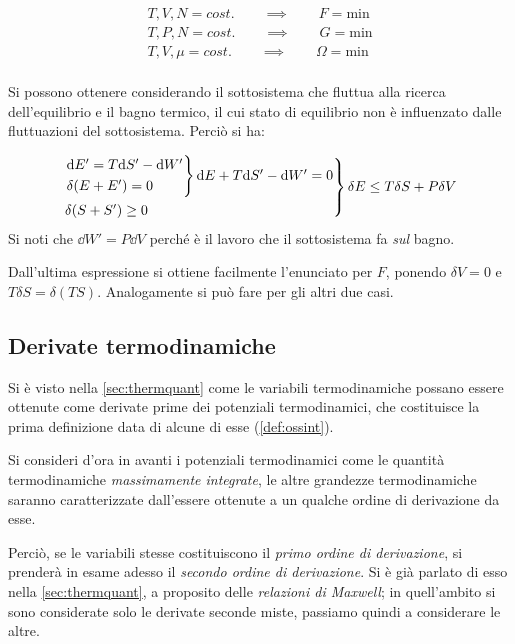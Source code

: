 \begin{align*}
	T, V, N = cost. \qquad \implies \qquad F = \text{min}\\
	T, P, N = cost. \qquad \implies \qquad G = \text{min}\\
	T, V, \mu = cost. \qquad \implies \qquad \Omega = \text{min}\\
\end{align*}

Si possono ottenere considerando il sottosistema che fluttua alla ricerca dell'equilibrio e il bagno termico, il cui stato di equilibrio non è influenzato dalle fluttuazioni del sottosistema. Perciò si ha:

\begin{equation*}
\begin{rcases*}
\begin{rcases*}
\dd E' = T \dd S' - \dd W'\\
\delta (E + E') = 0
\end{rcases*} \dd E + T \dd S' - \dd W' = 0\\
\delta (S + S') \geq 0
\end{rcases*}
\delta E \leq T \delta S + P \delta V
\end{equation*}
\noindent Si noti che $ \dd W' = P \dd V$ perché è il lavoro che il sottosistema fa \textit{sul} bagno.

Dall'ultima espressione si ottiene facilmente l'enunciato per $F$, ponendo $\delta V = 0$ e $T \delta S = \delta (T S)$. Analogamente si può fare per gli altri due casi.

\subsection{Derivate termodinamiche}
\label{sec:thermdev}

Si è visto nella \cref{sec:thermquant} come le variabili termodinamiche possano essere ottenute come derivate prime dei potenziali termodinamici, che costituisce la prima definizione data di alcune di esse (\cref{def:ossint}).

Si consideri d'ora in avanti i potenziali termodinamici come le quantità termodinamiche \textit{massimamente integrate}, le altre grandezze termodinamiche saranno caratterizzate dall'essere ottenute a un qualche ordine di derivazione da esse.

Perciò, se le variabili stesse costituiscono il \textit{primo ordine di derivazione}, si prenderà in esame adesso il \textit{secondo ordine di derivazione}. Si è già parlato di esso nella \cref{sec:thermquant}, a proposito delle \textit{relazioni di Maxwell}; in quell'ambito si sono considerate solo le derivate seconde miste, passiamo quindi a considerare le altre.

